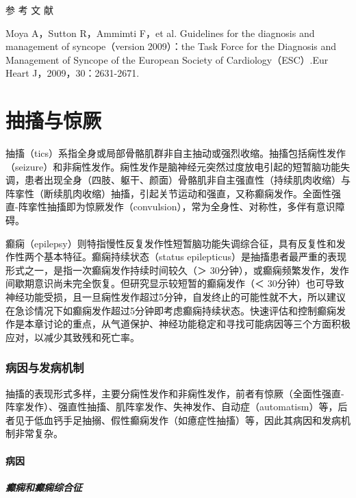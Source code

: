 \hypertarget{text00015.htmlux5cux23CHP1-4-6}{}
参 考 文 献

Moya A，Sutton R，Ammimti F，et al. Guidelines for the diagnosis and
management of syncope（version 2009）：the Task Force for the Diagnosis
and Management of Syncope of the European Society of
Cardiology（ESC）.Eur Heart J，2009，30：2631-2671.

\protect\hypertarget{text00016.html}{}{}

\chapter{抽搐与惊厥}

抽搐（tics）系指全身或局部骨骼肌群非自主抽动或强烈收缩。抽搐包括痫性发作（seizure）和非痫性发作。痫性发作是脑神经元突然过度放电引起的短暂脑功能失调，患者出现全身（四肢、躯干、颜面）骨骼肌非自主强直性（持续肌肉收缩）与阵挛性（断续肌肉收缩）抽搐，引起关节运动和强直，又称癫痫发作。全面性强直-阵挛性抽搐即为惊厥发作（convulsion），常为全身性、对称性，多伴有意识障碍。

癫痫（epilepsy）则特指慢性反复发作性短暂脑功能失调综合征，具有反复性和发作性两个基本特征。癫痫持续状态（status
epilepticus）是抽搐患者最严重的表现形式之一，是指一次癫痫发作持续时间较久（＞
30分钟），或癫痫频繁发作，发作间歇期意识尚未完全恢复。但研究显示较短暂的癫痫发作（＜
30分钟）也可导致神经功能受损，且一旦痫性发作超过5分钟，自发终止的可能性就不大，所以建议在急诊情况下如癫痫发作超过5分钟即考虑癫痫持续状态。快速评估和控制癫痫发作是本章讨论的重点，从气道保护、神经功能稳定和寻找可能病因等三个方面积极应对，以减少其致残和死亡率。

\subsection{病因与发病机制}

抽搐的表现形式多样，主要分痫性发作和非痫性发作，前者有惊厥（全面性强直-阵挛发作）、强直性抽搐、肌阵挛发作、失神发作、自动症（automatism）等，后者见于低血钙手足抽搦、假性癫痫发作（如癔症性抽搐）等，因此其病因和发病机制非常复杂。

\subsubsection{病因}

\paragraph{癫痫和癫痫综合征}

